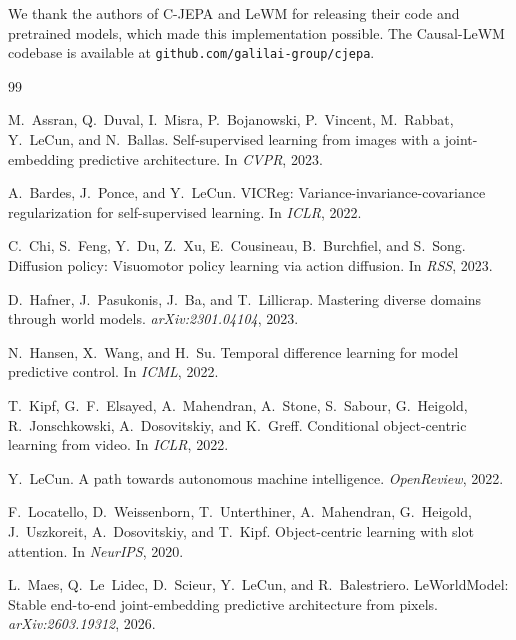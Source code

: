 \documentclass[12pt]{article}
\begin{document}
We thank the authors of C-JEPA and LeWM for releasing their code and pretrained models, which made this implementation possible. The Causal-LeWM codebase is available at \texttt{github.com/galilai-group/cjepa}.


\begin{thebibliography}{99}

M.~Assran, Q.~Duval, I.~Misra, P.~Bojanowski, P.~Vincent, M.~Rabbat, Y.~LeCun, and N.~Ballas.
\newblock Self-supervised learning from images with a joint-embedding predictive architecture.
\newblock In \textit{CVPR}, 2023.

A.~Bardes, J.~Ponce, and Y.~LeCun.
\newblock VICReg: Variance-invariance-covariance regularization for self-supervised learning.
\newblock In \textit{ICLR}, 2022.

C.~Chi, S.~Feng, Y.~Du, Z.~Xu, E.~Cousineau, B.~Burchfiel, and S.~Song.
\newblock Diffusion policy: Visuomotor policy learning via action diffusion.
\newblock In \textit{RSS}, 2023.

D.~Hafner, J.~Pasukonis, J.~Ba, and T.~Lillicrap.
\newblock Mastering diverse domains through world models.
\newblock \textit{arXiv:2301.04104}, 2023.

N.~Hansen, X.~Wang, and H.~Su.
\newblock Temporal difference learning for model predictive control.
\newblock In \textit{ICML}, 2022.

T.~Kipf, G.~F.~Elsayed, A.~Mahendran, A.~Stone, S.~Sabour, G.~Heigold, R.~Jonschkowski, A.~Dosovitskiy, and K.~Greff.
\newblock Conditional object-centric learning from video.
\newblock In \textit{ICLR}, 2022.

Y.~LeCun.
\newblock A path towards autonomous machine intelligence.
\newblock \textit{OpenReview}, 2022.

F.~Locatello, D.~Weissenborn, T.~Unterthiner, A.~Mahendran, G.~Heigold, J.~Uszkoreit, A.~Dosovitskiy, and T.~Kipf.
\newblock Object-centric learning with slot attention.
\newblock In \textit{NeurIPS}, 2020.

L.~Maes, Q.~Le~Lidec, D.~Scieur, Y.~LeCun, and R.~Balestriero.
\newblock LeWorldModel: Stable end-to-end joint-embedding predictive architecture from pixels.
\newblock \textit{arXiv:2603.19312}, 2026.


\end{thebibliography}
\end{document}

